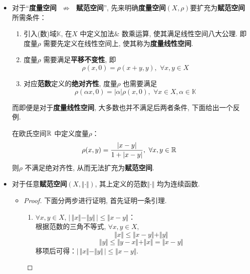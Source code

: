\begin{defn}
\begin{rmk}
\begin{itemize}
				\newpage
				
				\item 对于“\textbf{度量空间} $\,\, \not\Rightarrow \,\,$ \textbf{赋范空间}”, 先来明确\textbf{度量空间$(X , \rho)$}要扩充为\textbf{赋范空间}所需条件：
				
				\vspace*{1em}
				
				\begin{enumerate}
					\item 引入(数)域$\mathbb{K}$, 在$X$ 中定义加法$\&$ 数乘运算, 使其满足线性空间八大公理. 即度量$\rho$ 需要先定义在线性空间上, 使其称为\textbf{度量线性空间}. 
					
					\vspace*{0.5em}
					
					\item 度量$\rho$ 需要满足\textbf{平移不变性}, 即
					\[ \rho(x , 0) = \rho(x + y , y) , \,\, \forall x , y \in X \]
					
					\item 对应\textbf{范数}定义的\textbf{绝对齐性}, 度量$\rho$ 也需要满足
					\[ \rho(\alpha x , 0) = \left| \alpha \right| \rho(x , 0) , \,\, \forall x \in X , \alpha \in \mathbb{K} \]
				\end{enumerate}
				
				\vspace*{1em}
				
				而即便是对于\textbf{度量线性空间}, 大多数也并不满足后两者条件, 下面给出一个反例.
				
				\begin{example}\label{ex 2.1.1}
					在欧氏空间$\mathbb{R}$ 中定义度量$\rho$：
					\[ \rho(x , y) = \frac{\left| x - y \right|}{1 + \left| x - y \right|} , \,\, \forall x , y \in \mathbb{R} \]
					则$\rho$ 不满足绝对齐性, 从而无法扩充为\textbf{赋范空间}.
				\end{example}
				
				\vspace*{6em}
				
				\item 对于任意\textbf{赋范空间}$(X , \Vert \cdot \Vert)$, 其上定义的范数$\Vert \cdot \Vert$ 均为连续函数.
				
				\begin{itemize}
					\item 
					\begin{proof}
						下面分两步进行证明, 首先证明一条引理. 
						\begin{enumerate}
							\item $\forall x , y \in X$, $\Big| \, \Vert x \Vert - \Vert y \Vert \, \Big| \leq \Vert x - y \Vert$：\\
							根据范数的三角不等式, $\forall x , y \in X$,
							\[ \Vert x \Vert \leq \Vert x - y \Vert + \Vert y \Vert \]
							\[ \Vert y \Vert \leq \Vert y - x \Vert + \Vert x \Vert = \Vert x - y \Vert \]
							移项后可得：$\Big| \, \Vert x \Vert - \Vert y \Vert \, \Big| \leq \Vert x - y \Vert$.
							

\end{enumerate}
\end{proof}
\end{itemize}
\end{itemize}
\end{rmk}
\end{defn}
